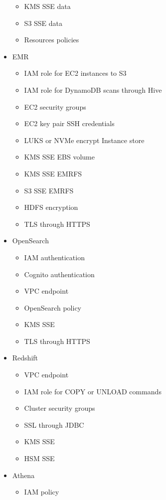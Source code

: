 \documentclass[../../main.tex]{subfiles}
\begin{document}
\begin{itemize}
\begin{itemize}
        \item KMS SSE data
        \item S3 SSE data
        \item Resources policies
    \end{itemize}
    \item EMR
    \begin{itemize}
        \item IAM role for EC2 instances to S3
        \item IAM role for DynamoDB scans through Hive
        \item EC2 security groups
        \item EC2 key pair SSH credentials
        \item LUKS or NVMe encrypt Instance store
        \item KMS SSE EBS volume
        \item KMS SSE EMRFS
        \item S3 SSE EMRFS
        \item HDFS encryption
        \item TLS through HTTPS
    \end{itemize}
    \item OpenSearch
    \begin{itemize}
        \item IAM authentication
        \item Cognito authentication
        \item VPC endpoint
        \item OpenSearch policy
        \item KMS SSE
        \item TLS through HTTPS
    \end{itemize}
    \item Redshift
    \begin{itemize}
        \item VPC endpoint
        \item IAM role for COPY or UNLOAD commands
        \item Cluster security groups
        \item SSL through JDBC
        \item KMS SSE
        \item HSM SSE
    \end{itemize}
    \item Athena
    \begin{itemize}
        \item IAM policy

\end{itemize}
\end{itemize}
\end{document}
